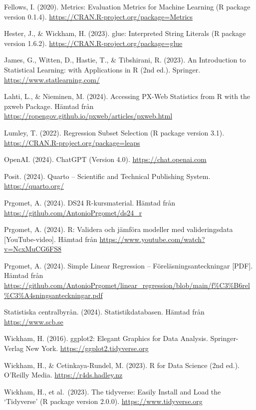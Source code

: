 \documentclass[
  letterpaper,
  DIV=11,
  numbers=noendperiod]{scrreprt}
\begin{document}
Fellows, I. (2020). Metrics: Evaluation Metrics for Machine Learning (R
package version 0.1.4). \url{https://CRAN.R-project.org/package=Metrics}

Hester, J., \& Wickham, H. (2023). glue: Interpreted String Literals (R
package version 1.6.2). \url{https://CRAN.R-project.org/package=glue}

James, G., Witten, D., Hastie, T., \& Tibshirani, R. (2023). An
Introduction to Statistical Learning: with Applications in R (2nd ed.).
Springer. \url{https://www.statlearning.com/}

Lahti, L., \& Nieminen, M. (2024). Accessing PX-Web Statistics from R
with the pxweb Package. Hämtad från
\url{https://ropengov.github.io/pxweb/articles/pxweb.html}

Lumley, T. (2022). Regression Subset Selection (R package version 3.1).
\url{https://CRAN.R-project.org/package=leaps}

OpenAI. (2024). ChatGPT (Version 4.0). \url{https://chat.openai.com}

Posit. (2024). Quarto -- Scientific and Technical Publishing System.
\url{https://quarto.org/}

Prgomet, A. (2024). DS24 R-kursmaterial. Hämtad från
\url{https://github.com/AntonioPrgomet/ds24_r}

Prgomet, A. (2024). R: Validera och jämföra modeller med valideringsdata
{[}YouTube-video{]}. Hämtad från
\url{https://www.youtube.com/watch?v=NcxMuCG6FS8}

Prgomet, A. (2024). Simple Linear Regression -- Föreläsningsanteckningar
{[}PDF{]}. Hämtad från
\url{https://github.com/AntonioPrgomet/linear_regression/blob/main/f%C3%B6rel%C3%A4sningsanteckningar.pdf}%

Statistiska centralbyrån. (2024). Statistikdatabasen. Hämtad från
\url{https://www.scb.se}

Wickham, H. (2016). ggplot2: Elegant Graphics for Data Analysis.
Springer-Verlag New York. \url{https://ggplot2.tidyverse.org}

Wickham, H., \& Cetinkaya-Rundel, M. (2023). R for Data Science (2nd
ed.). O'Reilly Media. \url{https://r4ds.hadley.nz}

Wickham, H., et al.~(2023). The tidyverse: Easily Install and Load the
`Tidyverse' (R package version 2.0.0). \url{https://www.tidyverse.org}
\end{document}
